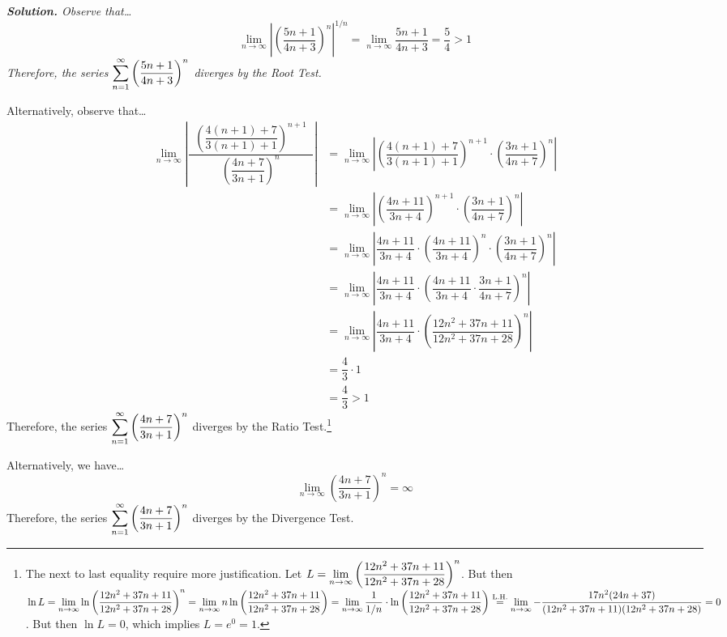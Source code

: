 \documentclass[12pt,letterpaper]{exam}
\begin{document}
\begin{questions}
{\small\itshape \textbf{Solution.} Observe that\dots
	\[
	\lim_{n \to \infty} \left| \left( \dfrac{5n + 1}{4n + 3} \right)^n \right|^{1/n}= \lim_{n \to \infty} \dfrac{5n + 1}{4n + 3}= \dfrac{5}{4} > 1
	\]
Therefore, the series $\displaystyle\sum_{n=1}^\infty \left( \dfrac{5n + 1}{4n + 3} \right)^n$ diverges by the Root Test. \pspace

Alternatively, observe that\dots
	\[
	\begin{aligned}
	\lim_{n \to \infty} \left| \dfrac{\;\;\left( \dfrac{4(n+1) + 7}{3(n+1) + 1} \right)^{n+1}\;\;}{\left( \dfrac{4n + 7}{3n + 1} \right)^n} \right|&= \lim_{n \to \infty} \left| \left( \dfrac{4(n+1) + 7}{3(n+1) + 1} \right)^{n+1} \cdot \left( \dfrac{3n + 1}{4n + 7} \right)^n \right| \\
	&= \lim_{n \to \infty} \left| \left( \dfrac{4n + 11}{3n + 4} \right)^{n+1} \cdot \left( \dfrac{3n + 1}{4n + 7} \right)^n \right| \\
	&= \lim_{n \to \infty} \left| \dfrac{4n + 11}{3n + 4} \cdot \left( \dfrac{4n + 11}{3n + 4} \right)^n \cdot \left( \dfrac{3n + 1}{4n + 7} \right)^n \right| \\
	&= \lim_{n \to \infty} \left| \dfrac{4n + 11}{3n + 4} \cdot \left( \dfrac{4n + 11}{3n + 4} \cdot \dfrac{3n + 1}{4n + 7} \right)^n \right| \\
	&= \lim_{n \to \infty} \left| \dfrac{4n + 11}{3n + 4} \cdot \left( \dfrac{12n^2 + 37n + 11}{12n^2 + 37n + 28} \right)^n \right| \\
	&= \dfrac{4}{3} \cdot 1 \\
	&= \dfrac{4}{3} > 1
	\end{aligned}
	\]
Therefore, the series $\displaystyle\sum_{n=1}^\infty \left( \dfrac{4n + 7}{3n + 1} \right)^n$ diverges by the Ratio Test.\footnote{The next to last equality require more justification. Let $\displaystyle L= \lim_{n \to \infty} \left( \dfrac{12n^2 + 37n + 11}{12n^2 + 37n + 28} \right)^n$. But then $\displaystyle \ln L= \lim_{n \to \infty} \ln \left( \dfrac{12n^2 + 37n + 11}{12n^2 + 37n + 28} \right)^n= \lim_{n \to \infty} n\ln \left( \dfrac{12n^2 + 37n + 11}{12n^2 + 37n + 28} \right)= \lim_{n \to \infty} \dfrac{1}{1/n} \cdot \ln \left( \dfrac{12n^2 + 37n + 11}{12n^2 + 37n + 28} \right) \stackrel{\text{L.H.}}{=} \lim_{n \to \infty} -\dfrac{17n^2 (24n + 37)}{(12n^2 + 37n + 11)(12n^2 + 37n + 28)}= 0$. But then $\ln L= 0$, which implies $L= e^0= 1$.}

Alternatively, we have\dots
	\[
	\lim_{n \to \infty} \left( \dfrac{4n + 7}{3n + 1} \right)^n= \infty
	\]
Therefore, the series $\displaystyle\sum_{n=1}^\infty \left( \dfrac{4n + 7}{3n + 1} \right)^n$ diverges by the Divergence Test.}




\end{questions}
\end{document}
